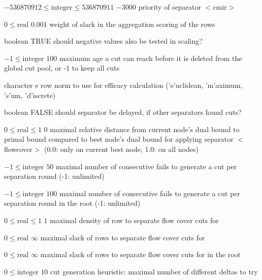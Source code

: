 %
{$-536870912\leq\textrm{integer}\leq536870911$}%
{$-3000$}%
{priority of separator $<$cmir$>$}%
{}

%
{$0\leq\textrm{real}$}%
{$0.001$}%
{weight of slack in the aggregation scoring of the rows}%
{}

%
{boolean}%
{TRUE}%
{should negative values also be tested in scaling?}%
{}

%
{$-1\leq\textrm{integer}$}%
{$100$}%
{maximum age a cut can reach before it is deleted from the global cut pool, or -1 to keep all cuts}%
{}

%
{character}%
{e}%
{row norm to use for efficacy calculation ('e'uclidean, 'm'aximum, 's'um, 'd'iscrete)}%
{}

%
{boolean}%
{FALSE}%
{should separator be delayed, if other separators found cuts?}%
{}

%
{$0\leq\textrm{real}\leq1$}%
{$0$}%
{maximal relative distance from current node's dual bound to primal bound compared to best node's dual bound for applying separator $<$flowcover$>$ (0.0: only on current best node, 1.0: on all nodes)}%
{}

%
{$-1\leq\textrm{integer}$}%
{$50$}%
{maximal number of consecutive fails to generate a cut per separation round (-1: unlimited)}%
{}

%
{$-1\leq\textrm{integer}$}%
{$100$}%
{maximal number of consecutive fails to generate a cut per separation round in the root (-1: unlimited)}%
{}

%
{$0\leq\textrm{real}\leq1$}%
{$1$}%
{maximal density of row to separate flow cover cuts for}%
{}

%
{$0\leq\textrm{real}$}%
{$\infty$}%
{maximal slack of rows to separate flow cover cuts for}%
{}

%
{$0\leq\textrm{real}$}%
{$\infty$}%
{maximal slack of rows to separate flow cover cuts for in the root}%
{}

%
{$0\leq\textrm{integer}$}%
{$10$}%
{cut generation heuristic: maximal number of different deltas to try}%
{}

